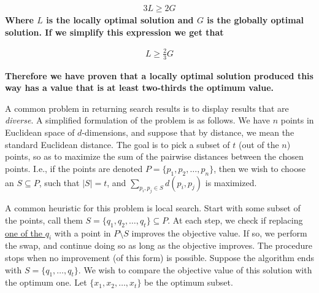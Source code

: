 \documentclass[addpoints]{exam}
\def\mysolution#1{}    %
\begin{document}
\begin{questions}
\begin{align}
    3L \ge 2G
\end{align}
\textbf{Where $L$ is the locally optimal solution and $G$ is the globally optimal solution. If we simplify this expression we get that}

\begin{align}
    L \ge \frac{2}{3}G
\end{align}

\textbf{Therefore we have proven that a locally optimal solution produced this way has a value that is at least two-thirds the optimum value.}
\mysolution{
    
}



A common problem in returning search results is to display results that are {\em diverse}. A simplified formulation of the problem is as follows. We have $n$ points in Euclidean space of $d$-dimensions, and suppose that by distance, we mean the standard Euclidean distance. The goal is to pick a subset of $t$ (out of the $n$) points, so as to maximize the sum of the pairwise distances between the chosen points. 
I.e., if the points are denoted $P = \{p_1, p_2, \dots, p_n\}$, then we wish to choose an $S \subseteq P$, such that $|S| = t$, and $\sum_{p_i, p_j \in S} d(p_i, p_j)$ is maximized.

A common heuristic for this problem is local search. Start with some subset of the points, call them $S = \{q_1, q_2, \dots, q_t\} \subseteq P$. At each step, we check if replacing \underline{one of the $q_i$} with a point in $P \setminus S$ improves the objective value.  If so, we perform the swap, and continue doing so as long as the objective improves. The procedure stops when no improvement (of this form) is possible. Suppose the algorithm ends with $S = \{q_1, \dots, q_t\}$.  We wish to compare the objective value of this solution with the optimum one. Let $\{x_1, x_2, \dots, x_t\}$ be the optimum subset. 

\end{questions}
\end{document}
